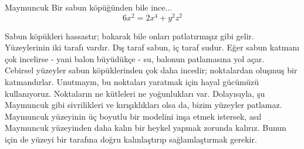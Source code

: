 \begin{surferPage}{Maymuncuk}
Bir sabun köpüğünden bile ince...\\
  \smallskip
\[6x^2	= 2x^4	+ y^2	z^2\]

\singlespacing
Sabun köpükleri hassastır; bakarak bile onları patlatırmışız gibi gelir. Yüzeylerinin iki tarafı vardır. Dış taraf sabun, iç taraf sudur. Eğer sabun katmanı çok incelirse - yani balon büyüdükçe - su, balonun patlamasına yol açar.\\
\vspace{0,3cm}
Cebirsel yüzeyler sabun köpüklerinden çok daha incedir; noktalardan oluşmuş bir katmandırlar. Unutmayın, bu noktaları yaratmak için hayal gücümüzü kullanıyoruz. Noktaların ne kütleleri ne yoğunlukları var. Dolayısıyla, şu Maymuncuk gibi sivrilikleri ve kırışıklıkları olsa da,   bizim yüzeyler patlamaz.\\
\vspace{0,3cm}
Maymuncuk yüzeyinin üç boyutlu bir modelini inşa etmek istersek, asıl Maymuncuk yüzeyinden daha kalın bir heykel yapmak zorunda kalırız. Bunun için de yüzeyi bir tarafına doğru kalınlaştırıp sağlamlaştırmak gerekir.
\end{surferPage}
